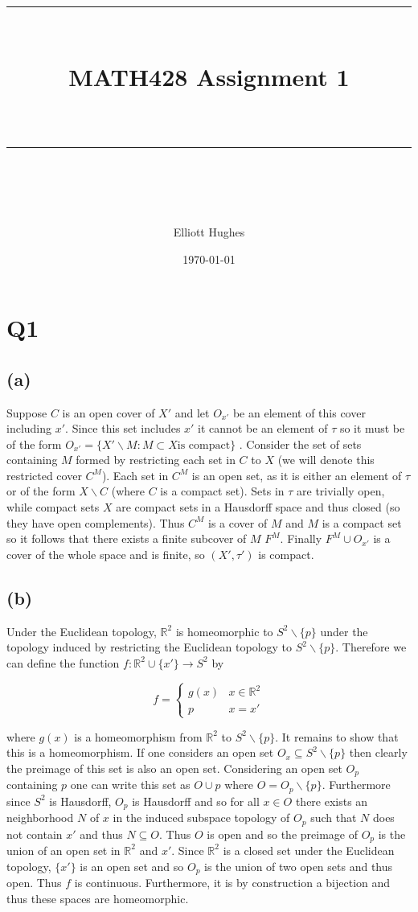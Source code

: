 \documentclass{article}
\title{	
	\normalfont\normalsize 
	\rule{\linewidth}{0.5pt}\\ %
	\vspace{14pt} %
	{\LARGE MATH428 Assignment 1 \\ %
    \large \textit{} \\}
	\vspace{6pt} %
	\rule{\linewidth}{1pt}\\ %
}
\author{Elliott Hughes}
\date{\normalsize\today}
\begin{document}
\maketitle

\section*{Q1}
\subsection*{(a)}
Suppose $C$ is an open cover of $X'$ and let $O_{x'}$ be an element of this cover including 
$x'$. Since this set includes $x'$ it cannot be an element of $\tau$ so it must be of the form 
$O_{x'} = \{X'\backslash M: M \subset X \text{is compact}\}$ . Consider the set of sets 
containing $M$ formed 
by restricting each set in $C$ to $X$ (we will denote this restricted cover $C^M$). Each set in 
$C^M$ is an open set, as it is either an element of $\tau$ or of the form $X\backslash C$ (where 
$C$ is a compact set). Sets in $\tau$ are trivially open, while compact sets $X$ are compact sets in a Hausdorff space
and thus closed (so they have open complements). Thus $C^M$ is a cover of $M$ and 
$M$ is a compact set so it follows that there exists a finite subcover of $M$ $F^M$. Finally 
$F^M \cup O_{x'}$ is a cover of the whole space and is finite, so $(X',\tau')$ is compact.

\subsection*{(b)}
Under the Euclidean topology, $\mathbb{R}^2$ is homeomorphic to $S^2\backslash \{p\}$ 
under the topology induced by restricting the Euclidean topology to $S^2\backslash \{p\}$. 
Therefore we can define the function $f:\mathbb{R}^2\cup \{x'\} \rightarrow S^2$ by 

\begin{equation*}
    f = 
    \begin{cases}
        g(x) & x \in \mathbb{R}^2 \\
        p & x = x'
    \end{cases}
\end{equation*}

where $g(x)$ is a homeomorphism from $\mathbb{R}^2$ to $S^2\backslash \{p\}$. It remains to show that 
this is a homeomorphism. If one considers an open set $O_x \subseteq S^2\backslash \{p\}$ then 
clearly the preimage of this set is also an open set. Considering an open set $O_{p}$ containing $p$ 
one can write this set as $O \cup p$ where $O = O_{p} \backslash \{p\}$. Furthermore since 
$S^2$ is Hausdorff, $O_{p}$ is Hausdorff and so for all $x \in O$ there exists an neighborhood $N$  
of $x$ in the induced subspace topology of $O_p$ such that $N$ does not contain $x'$ and thus $N \subseteq O$. Thus $O$ is open and so the preimage of $O_{p}$ is the 
union of an open set in $\mathbb{R}^2$ and $x'$. Since $\mathbb{R}^2$ is a closed set under the 
Euclidean topology, $\{x'\}$ is an open set and so $O_p$ is the union of two open sets and thus 
open. Thus $f$ is continuous. Furthermore, it is by construction a bijection and 
thus these spaces are homeomorphic.
\end{document}
